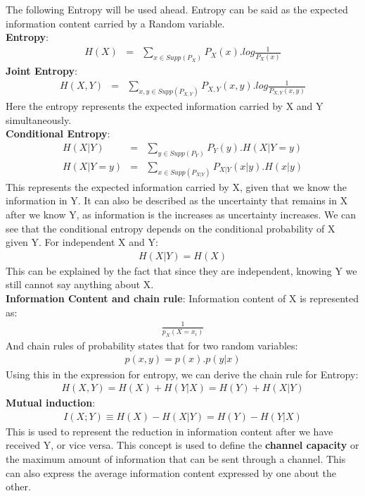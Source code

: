 \documentclass[10pt,twocolumn,letterpaper]{article}
\begin{document}
The following Entropy will be used ahead. Entropy can be said as the expected information content carried by a Random variable.\\
\textbf{Entropy}:
\begin{eqnarray*}
H(X)&=&\sum_{x\in Supp(P_{X})}{P_{X}(x).log\frac{1}{P_{X}(x)}}
\end{eqnarray*}
\textbf{Joint Entropy}:
\begin{eqnarray*}
H(X,Y)&=&\sum_{x,y\in Supp(P_{X,Y})}{P_{X,Y}(x,y).log\frac{1}{P_{X,Y}(x,y)}}
\end{eqnarray*}
Here the entropy represents the expected information carried by X and Y simultaneously.\\
\textbf{Conditional Entropy}:
\begin{eqnarray*}
H(X|Y)&=&\sum_{y\in Supp(P_{Y})}{P_{Y}(y).H(X|Y=y)}\\
H(X|Y=y)&=&\sum_{x\in Supp(P_{X|Y})}{P_{X|Y}(x|y).H(x|y)}
\end{eqnarray*}
This represents the expected information carried by X, given that we know the information in Y.
It can also be described as the uncertainty that remains in X after we know Y, as information is the increases as uncertainty increases. We can see that the conditional entropy depends on the conditional probability of X given Y.
For independent X and Y:
\begin{eqnarray*}
H(X|Y)=H(X)
\end{eqnarray*}
This can be explained by the fact that since they are independent, knowing Y we still cannot say anything about X.\\
\textbf{Information Content and chain rule}:
Information content of X is represented as:
\begin{eqnarray*}
    \frac{1}{p_X(X=x_i)}
\end{eqnarray*}
And chain rules of probability states that for two random variables:
\begin{eqnarray*}
    p(x,y)=p(x).p(y|x)
\end{eqnarray*}
Using this in the expression for entropy, we can derive the chain rule for Entropy:
\begin{eqnarray*}
    H(X,Y)=H(X)+H(Y|X)=H(Y)+H(X|Y)
\end{eqnarray*}
\textbf{Mutual induction}:
\begin{eqnarray*}
I(X;Y)\equiv H(X)-H(X|Y)=H(Y)-H(Y|X) 
\end{eqnarray*}
This is used to represent the reduction in information content after we have received Y, or vice versa. This concept is used to define the \textbf{channel capacity} or the maximum amount of information that can be sent through a channel. This can also express the average information content expressed by one about the other. 
\end{document}
